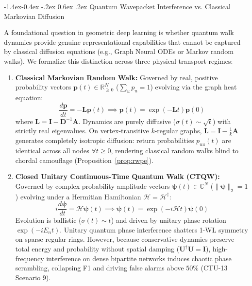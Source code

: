 \documentclass[10pt,twocolumn,letterpaper]{article}
\makeatletter
\renewcommand\subsection{\@startsection{subsection}{2}{\z@}%
                                     {-1.4ex\@plus -0.4ex \@minus -.2ex}%
                                     {0.6ex \@plus .2ex}%
                                     {\normalfont\normalsize\bfseries}}
\makeatother
\begin{document}
\subsection{Quantum Wavepacket Interference vs. Classical Markovian Diffusion}
\label{sec:quantum_vs_classical}

A foundational question in geometric deep learning is whether quantum walk dynamics provide genuine representational capabilities that cannot be captured by classical diffusion equations (e.g., Graph Neural ODEs or Markov random walks). We formalize this distinction across three physical transport regimes:
\begin{enumerate}
    \item \textbf{Classical Markovian Random Walk:} 
    Governed by real, positive probability vectors $\mathbf{p}(t) \in \mathbb{R}^N_{\ge 0}$ ($\sum_u p_u = 1$) evolving via the graph heat equation:
    \begin{equation}
    \frac{d\mathbf{p}}{dt} = -\mathbf{L} \mathbf{p}(t) \implies \mathbf{p}(t) = \exp(-\mathbf{L} t) \mathbf{p}(0)
    \end{equation}
    where $\mathbf{L} = \mathbf{I} - \mathbf{D}^{-1}\mathbf{A}$. Dynamics are purely diffusive ($\sigma(t) \sim \sqrt{t}$) with strictly real eigenvalues. On vertex-transitive $k$-regular graphs, $\mathbf{L} = \mathbf{I} - \frac{1}{k}\mathbf{A}$ generates completely isotropic diffusion: return probabilities $p_{uu}(t)$ are identical across all nodes $\forall t \ge 0$, rendering classical random walks blind to chordal camouflage (Proposition~\ref{prop:rwpe}).
    \item \textbf{Closed Unitary Continuous-Time Quantum Walk (CTQW):} 
    Governed by complex probability amplitude vectors $\boldsymbol{\psi}(t) \in \mathbb{C}^N$ ($\|\boldsymbol{\psi}\|_2 = 1$) evolving under a Hermitian Hamiltonian $\mathcal{H} = \mathcal{H}^\dagger$:
    \begin{equation}
    i \frac{d\boldsymbol{\psi}}{dt} = \mathcal{H} \boldsymbol{\psi}(t) \implies \boldsymbol{\psi}(t) = \exp(-i \mathcal{H} t) \boldsymbol{\psi}(0)
    \end{equation}
    Evolution is ballistic ($\sigma(t) \sim t$) and driven by unitary phase rotation $\exp(-i E_n t)$. Unitary quantum phase interference shatters 1-WL symmetry on sparse regular rings. However, because conservative dynamics preserve total energy and probability without spatial damping ($\mathbf{U}^\dagger \mathbf{U} = \mathbf{I}$), high-frequency interference on dense bipartite networks induces chaotic phase scrambling, collapsing F1 and driving false alarms above $50\%$ (CTU-13 Scenario 9).

\end{enumerate}
\end{document}

